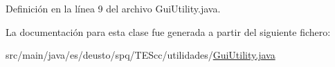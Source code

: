 Definición en la línea 9 del archivo Gui\+Utility.\+java.



La documentación para esta clase fue generada a partir del siguiente fichero\+:\begin{DoxyCompactItemize}
\item 
src/main/java/es/deusto/spq/\+T\+E\+Scc/utilidades/\hyperlink{_gui_utility_8java}{Gui\+Utility.\+java}\end{DoxyCompactItemize}

